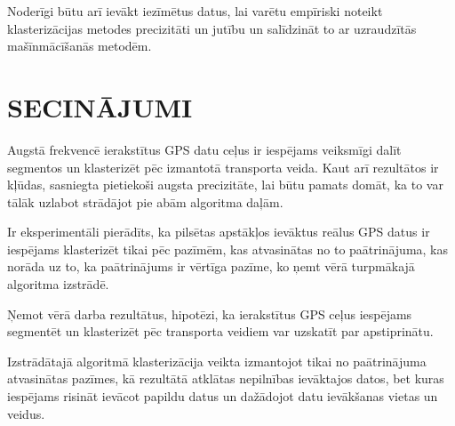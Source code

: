 \documentclass{ludis}
\begin{document}
Noderīgi būtu arī ievākt iezīmētus datus, lai varētu empīriski noteikt klasterizācijas metodes
precizitāti un jutību un salīdzināt to ar uzraudzītās mašīnmācīšanās metodēm.

\chapter{SECINĀJUMI}
Augstā frekvencē ierakstītus GPS datu ceļus ir iespējams veiksmīgi dalīt segmentos un klasterizēt
pēc izmantotā transporta veida. Kaut arī rezultātos ir kļūdas, sasniegta pietiekoši augsta
precizitāte, lai būtu pamats domāt, ka to var tālāk uzlabot strādājot pie abām algoritma
daļām. 

Ir eksperimentāli pierādīts, ka pilsētas apstākļos ievāktus reālus GPS datus ir iespējams
klasterizēt tikai pēc pazīmēm, kas atvasinātas no to paātrinājuma, kas norāda uz to, 
ka \linebreak paātrinājums ir vērtīga pazīme, ko ņemt vērā turpmākajā algoritma izstrādē.

Ņemot vērā darba rezultātus, hipotēzi, ka ierakstītus GPS ceļus iespējams segmentēt un klasterizēt
pēc transporta veidiem var uzskatīt par apstiprinātu.

Izstrādātajā algoritmā klasterizācija veikta izmantojot tikai no paātrinājuma atvasinātas pazīmes,
kā rezultātā atklātas nepilnības ievāktajos datos, bet kuras iespējams risināt ievācot papildu
datus un dažādojot datu ievākšanas vietas un veidus.

\end{document}
